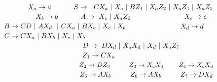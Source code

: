 $ \hspace*{2.2cm}X_a\rightarrow a $        $ \hspace*{1cm}S\rightarrow \  \ CX_a\  | \ X_c  \ | \ BZ_1\   |\ X_aZ_2\   |\ X_aZ_4\  |\ X_aZ_5\ $\newline
$ \hspace*{2.6cm}X_b\rightarrow b $        $ \hspace*{1cm}A\rightarrow \ X_c \  | \ X_aZ_6 $\newline
$ \hspace*{2.6cm}X_c\rightarrow c  $        $ \hspace*{1cm}B\rightarrow CD\  |\  AX_d  \ \  |\ CX_a\  |\ BX_b\  |\ X_c\  |\ X_b $\newline
$ \hspace*{2.6cm}X_d\rightarrow d $        $ \hspace*{1cm}C\rightarrow CX_a\  |\  BX_b \ |\ X_c \  |\ X_b $\newline
                                                                              $ \hspace*{5cm}D\rightarrow \ DX_d\ |\ X_aX_d\  |\ X_d \  | \ X_aZ_7$\newline
                                                                              $ \hspace*{5cm} Z_1\rightarrow CX_a\hspace{1cm}$ \newline
                                                                              $ \hspace*{5cm}Z_2\rightarrow DZ_3 \hspace{1cm} Z_3\rightarrow X_cX_d \hspace{0.8cm} Z_4\rightarrow X_cX_d\hspace{1cm}$ \newline
                                                                              $ \hspace*{5cm}Z_5\rightarrow AX_b\hspace{1cm} Z_6\rightarrow AX_b \hspace{1cm} Z_7\rightarrow DX_d\hspace{1cm}$ \newline




